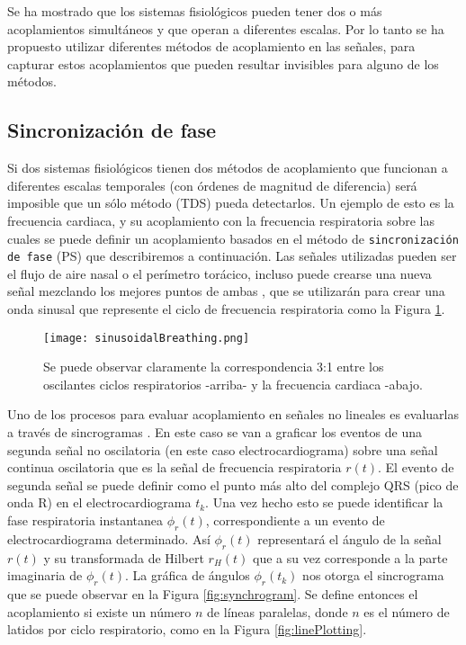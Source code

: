 \documentclass[twoside,twocolumn]{article}
\begin{document}
Se ha mostrado que los sistemas fisiológicos pueden tener dos o más acoplamientos simultáneos y que operan a diferentes escalas.
Por lo tanto se ha propuesto utilizar diferentes métodos de acoplamiento en las señales, para capturar estos acoplamientos que pueden resultar invisibles para alguno de los métodos.
\subsection{Sincronización de fase}
Si dos sistemas fisiológicos tienen dos métodos de acoplamiento que funcionan a diferentes escalas temporales (con órdenes de magnitud de diferencia) será imposible que un sólo método (TDS) pueda detectarlos.
Un ejemplo de esto es la frecuencia cardiaca, y su acoplamiento con la frecuencia respiratoria \cite{bartsch2014coexisting} sobre las cuales se puede definir un acoplamiento basados en el método de \texttt{sincronización de fase} (PS) que describiremos a continuación.
Las señales utilizadas pueden ser el flujo de aire nasal o el perímetro torácico, incluso puede crearse una nueva señal mezclando los mejores puntos de ambas \cite{bartsch2014coexisting}, que se utilizarán para crear una onda sinusal que represente el ciclo de frecuencia respiratoria como la Figura \ref{fig:sinusoidalBreathing}.
\begin{figure}[H]
\texttt{[image: sinusoidalBreathing.png]}
\caption{Se puede observar claramente la correspondencia 3:1 entre los oscilantes ciclos respiratorios -arriba- y la frecuencia cardiaca -abajo. }
\label{fig:sinusoidalBreathing}
\end{figure}
Uno de los procesos para evaluar acoplamiento en señales no lineales es evaluarlas a través de sincrogramas \cite{bartsch2014coexisting}.
En este caso se van a graficar los eventos de una segunda señal no oscilatoria (en este caso electrocardiograma) sobre una señal continua oscilatoria que es la señal de frecuencia respiratoria $r(t)$. El evento de segunda señal se puede definir como el punto más alto del complejo QRS (pico de onda R) en el electrocardiograma $t_k$.
Una vez hecho esto se puede identificar la fase respiratoria instantanea $\phi_r(t)$, correspondiente a un evento de electrocardiograma determinado. Así  $\phi_r(t)$ representará el ángulo de la señal $r(t)$ y su transformada de Hilbert $r_H(t)$ que a su vez corresponde a la parte imaginaria de $\phi_r(t)$.
La gráfica de ángulos $\phi_r(t_k)$ nos otorga el sincrograma que se puede observar en la Figura \ref{fig:synchrogram}. Se define entonces el acoplamiento si existe un número $n$ de líneas paralelas, donde $n$ es el número de latidos por ciclo respiratorio, como en la Figura \ref{fig:linePlotting}.
\end{document}
